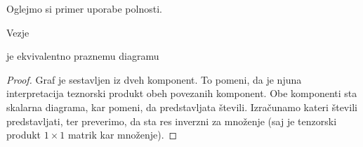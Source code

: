 \documentclass[mat1]{fmfdelo}
\begin{document}
Oglejmo si primer uporabe polnosti.
\begin{izrek}\label{inv-koren}
    Vezje
    \begin{center}
    \end{center}
    je ekvivalentno praznemu diagramu
\end{izrek}
\begin{proof}
    Graf je sestavljen iz dveh komponent. To pomeni, da je njuna interpretacija teznorski produkt obeh povezanih komponent. Obe komponenti sta skalarna diagrama, kar pomeni, da predstavljata števili. Izračunamo kateri števili predstavljati, ter preverimo, da sta res inverzni za množenje (saj je tenzorski produkt \(1\times 1\) matrik kar množenje).


\end{proof}
\end{document}
